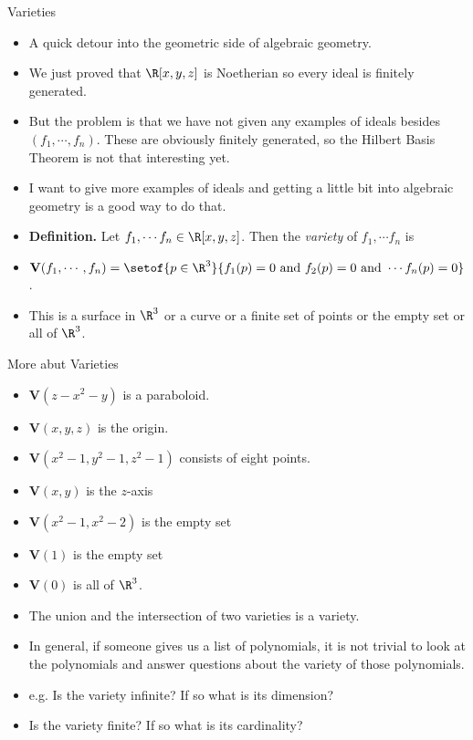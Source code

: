 \documentclass{beamer}
\begin{document}

\begin{frame}{Varieties}

\begin{itemize}
  \item A quick detour into the geometric side of algebraic geometry.
  \item We just proved that $\R[x,y,z]$ is Noetherian so every ideal is finitely generated.
  \item But the problem is that we have not given any examples of ideals besides $(f_1,\cdots, f_n)$. These are obviously finitely generated,
  so the Hilbert Basis Theorem is not that interesting yet.
  \item I want to give more examples of ideals and getting a little bit into algebraic geometry is a good way to do that.
  \item \textbf{Definition.} Let $f_1,\cdots f_n \in \R[x,y,z]$. Then the \emph{variety} of $f_1,\cdots f_n$ is
  \item $\mathbf{V}(f_1,\cdots,f_n) = \setof{p\in\R^3}{f_1(p)=0 \text{ and } f_2(p)=0 \text{ and } \cdots f_n(p)=0}$.
  \item This is a surface in $\R^3$ or a curve or a finite set of points or the empty set or all of $\R^3$.
\end{itemize}
\end{frame}



\begin{frame}{More abut Varieties}

\begin{itemize}
  \item $\mathbf{V}(z-x^2-y)$ is a paraboloid.
  \item $\mathbf{V}(x,y,z)$ is the origin.
  \item $\mathbf{V}(x^2-1,y^2-1,z^2-1)$ consists of eight points.
  \item $\mathbf{V}(x,y)$ is the $z$-axis
  \item $\mathbf{V}(x^2 - 1,x^2 - 2)$ is the empty set
  \item $\mathbf{V}(1)$ is the empty set
  \item $\mathbf{V}(0)$ is all of $\R^3$.
  \item The union and the intersection of two varieties is a variety.
  \item In general, if someone gives us a list of polynomials, it is not trivial to look at the polynomials and
  answer questions about the variety of those polynomials.
  \item e.g. Is the variety infinite? If so what is its dimension?
  \item Is the variety finite? If so what is its cardinality?

\end{itemize}
\end{frame}
\end{document}
